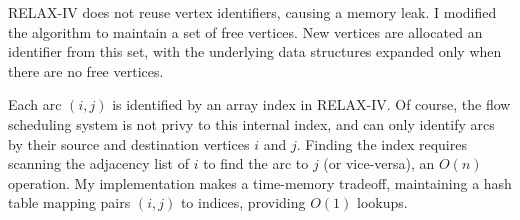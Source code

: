 RELAX-IV does not reuse vertex identifiers, causing a memory leak. I modified the algorithm to maintain a set of free vertices. New vertices are allocated an identifier from this set, with the underlying data structures expanded only when there are no free vertices.

Each arc $(i,j)$ is identified by an array index in RELAX-IV. Of course, the flow scheduling system is not privy to this internal index, and can only identify arcs by their source and destination vertices $i$ and $j$. Finding the index requires scanning the adjacency list of $i$ to find the arc to $j$ (or vice-versa), an $O(n)$ operation. My implementation makes a time-memory tradeoff, maintaining a hash table mapping pairs $(i,j)$ to indices, providing $O(1)$ lookups.

%
%
%
%
%
%
%
%
%
%
%

